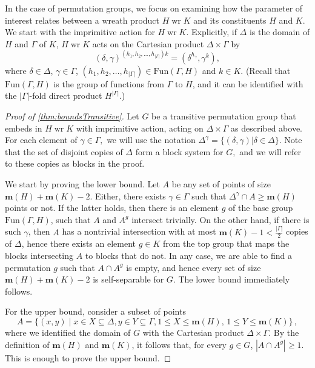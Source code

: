 \documentclass[a4paper]{amsart}
\newcommand{\Fun}{\mathrm{Fun}}
\renewcommand{\wr}{\mathop{\mathrm{wr}}}
\newcommand{\m}{\mathbf{m}}
\theoremstyle{definition}
\newtheorem*{thmnon}{Theorem}
\begin{document}
In the case of permutation groups, we focus on examining how the parameter of interest relates between a wreath product $H \wr K$ and its constituents $H$ and $K$. We start with the imprimitive action for $H\wr K$. Explicitly, if $\Delta$ is the domain of $H$ and $\Gamma$ of $K$, $H\wr K$ acts on the Cartesian product $\Delta \times \Gamma$ by 
\[ (\delta,\gamma)^{(h_1,h_2,\dots,h_{|\Gamma|})k} = (\delta^{h_\gamma}, \gamma^k),\]
where $\delta \in \Delta$, $\gamma \in \Gamma$, $(h_1,h_2,\dots,h_{|\Gamma|}) \in \Fun(\Gamma,H)$ and $k\in K$. (Recall that $\Fun(\Gamma,H)$ is the group of functions from $\Gamma$ to $H$, and it can be identified with the $|\Gamma|$-fold direct product $H^{|\Gamma|}$.)

\begin{proof}[Proof of \cref{thm:boundsTransitive}]
Let $G$ be a transitive permutation group that embeds in $H \wr K$ with imprimitive action, acting on $\Delta \times \Gamma$ as described above. For each element of $\gamma \in \Gamma,$ we will use the notation $\Delta ^\gamma =\{(\delta,\gamma)| \delta \in \Delta\}.$ Note that the set of disjoint copies of $\Delta$ form a block system for $G,$ and we will refer to these copies as blocks in the proof.

We start by proving the lower bound. Let $A$ be any set of points of size $\m(H)+\m(K)-2$. Either, there exists $\gamma \in \Gamma$ such that $\Delta^\gamma \cap A\geq \m(H)$ points or not. If the latter holds, then there is an element $g$ of the base group $\Fun(\Gamma,H)$, such that $A$ and $A^g$ intersect trivially. On the other hand, if there is such $\gamma$, then $A$ has a nontrivial intersection with at most $\m(K)-1<\frac{|\Gamma|}{2}$ copies of $\Delta$, hence there exists an element $g\in K$ from the top group that maps the blocks intersecting $A$ to blocks that do not. In any case, we are able to find a permutation $g$ such that $A\cap A^g$ is empty, and hence every set of size $\m(H)+\m(K)-2$ is self-separable for $G$. The lower bound immediately follows. 

For the upper bound, consider a subset of points
\[ A = \{ (x,y) \mid x\in X\subseteq \Delta, y\in Y\subseteq \Gamma, 1\le X \le \m(H) ,\, 1\le Y \le \m(K)\} \,,\]
where we identified the domain of $G$ with the Cartesian product $\Delta \times \Gamma$. By the definition of $\m(H)$ and $\m(K)$, it follows that, for every $g\in G$, $|A\cap A^g|\ge 1$. This is enough to prove the upper bound.
\end{proof}
\end{document}
